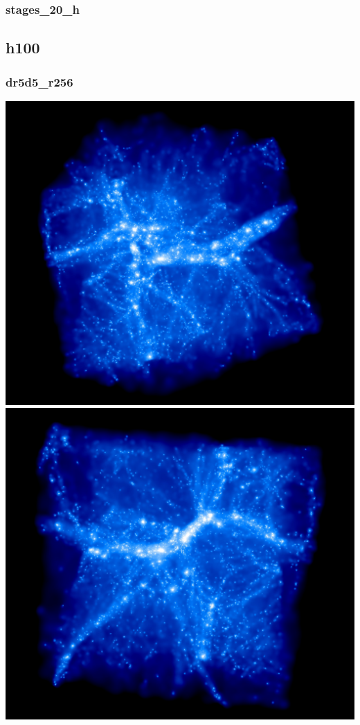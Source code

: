 % 
%
%
%
%
%
%
%

\newpage

\subsubsection{stages\_20\_h}


\subsection{h100}

\subsubsection{dr5d5\_r256}
\includegraphics[scale=0.12]{r256/h100/dr5d5_r256/rotate_00188.jpg} 
\includegraphics[scale=0.12]{r256/h100/dr5d5_r256/rotate_00320.jpg} \\
